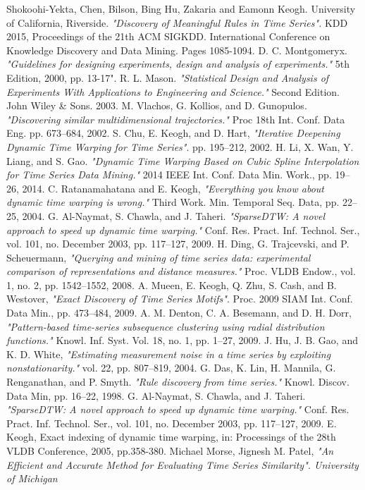 \begin{thebibliography}{9}
Shokoohi-Yekta, Chen, Bilson, Bing Hu, Zakaria and Eamonn Keogh. University of California, Riverside. \textit{"Discovery of Meaningful Rules in Time Series".} KDD 2015, Proceedings of the 21th ACM SIGKDD. International Conference on Knowledge Discovery and Data Mining. Pages 1085-1094.
D. C. Montgomeryx.
\textit{"Guidelines for designing experiments, design and analysis of experiments."} 5th Edition, 2000, pp. 13-17".
R. L. Mason. \textit{"Statistical Design and Analysis of Experiments With Applications to Engineering and Science."} Second Edition. John Wiley \& Sons. 2003.
M. Vlachos, G. Kollios, and D. Gunopulos. \textit{"Discovering similar multidimensional trajectories."} Proc 18th Int. Conf. Data Eng. pp. 673–684, 2002.
S. Chu, E. Keogh, and D. Hart, \textit{"Iterative Deepening Dynamic Time Warping for Time Series"}. pp. 195–212, 2002.
H. Li, X. Wan, Y. Liang, and S. Gao. \textit{"Dynamic Time Warping Based on Cubic Spline Interpolation for Time Series Data Mining."} 2014 IEEE Int. Conf. Data Min. Work., pp. 19–26, 2014.
C. Ratanamahatana and E. Keogh, \textit{"Everything you know about dynamic time warping is wrong."} Third Work. Min. Temporal Seq. Data, pp. 22–25, 2004.
G. Al-Naymat, S. Chawla, and J. Taheri. \textit{"SparseDTW: A novel approach to speed up dynamic time warping."} Conf. Res. Pract. Inf. Technol. Ser., vol. 101, no. December 2003, pp. 117–127, 2009.
H. Ding, G. Trajcevski, and P. Scheuermann, \textit{"Querying and mining of time series data: experimental comparison of representations and distance measures."} Proc. VLDB Endow., vol. 1, no. 2, pp. 1542–1552, 2008.
A. Mueen, E. Keogh, Q. Zhu, S. Cash, and B. Westover, \textit{"Exact Discovery of Time Series Motifs"}. Proc. 2009 SIAM Int. Conf. Data Min., pp. 473–484, 2009.
A. M. Denton, C. A. Besemann, and D. H. Dorr, \textit{"Pattern-based time-series subsequence clustering using radial distribution functions."} Knowl. Inf. Syst. Vol. 18, no. 1, pp. 1–27, 2009.
J. Hu, J. B. Gao, and K. D. White, \textit{"Estimating measurement noise in a time series by exploiting nonstationarity."} vol. 22, pp. 807–819, 2004.
G. Das, K. Lin, H. Mannila, G. Renganathan, and P. Smyth. \textit{"Rule discovery from time series."} Knowl. Discov. Data Min, pp. 16–22, 1998.
G. Al-Naymat, S. Chawla, and J. Taheri. \textit{"SparseDTW: A novel approach to speed up dynamic time warping."} Conf. Res. Pract. Inf. Technol. Ser., vol. 101, no. December 2003, pp. 117–127, 2009.
E. Keogh, Exact indexing of dynamic time warping, in: Processings
of the 28th VLDB Conference, 2005, pp.358-380.
Michael Morse, Jignesh M. Patel, \textit{"An Efficient and Accurate Method for Evaluating Time
Series Similarity". University of Michigan}
\end{thebibliography}